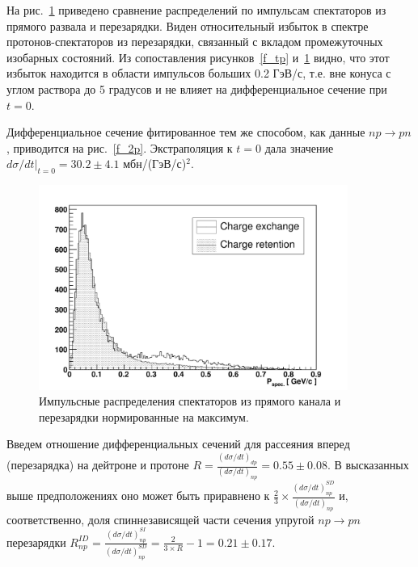 \documentclass[a4paper,12pt]{article}
\begin{document}
На рис.~\ref{f_res} приведено сравнение распределений по
импульсам спектаторов из прямого развала и перезарядки. Виден
относительный избыток в спектре протонов-спектаторов из перезарядки,
связанный с вкладом промежуточных изобарных состояний. Из
сопоставления рисунков~\ref{f_tp} и~\ref{f_res} видно, что этот
избыток находится в области импульсов больших 0.2 ГэВ/с, т.е. вне
конуса с углом раствора до 5 градусов и не влияет на дифференциальное
сечение при $t = 0$.

Дифференциальное сечение фитированное тем же способом, как данные $np
\to pn$, приводится на рис.~\ref{f_2p}.  Экстраполяция к $t = 0$ дала
значение $d\sigma/dt|_{t=0} = 30.2 \pm 4.1$ мбн/(ГэВ/с)$^{2}$.

\begin{figure}[hp]
  \centering
  \includegraphics[width=0.90\textwidth]{fig_res.pdf}
  \caption {Импульсные распределения спектаторов из прямого канала и
    перезарядки нормированные на максимум.}
  \label{f_res}
\end{figure}

Введем отношение дифференциальных сечений для рассеяния вперед
(перезарядка) на дейтроне и протоне
$R = \frac{(d\sigma/dt)_{dp}}{(d\sigma/dt)_{np}} = 0.55\pm 0.08$.
В высказанных выше предположениях оно может быть приравнено к
$\frac{2}{3} \times \frac{(d\sigma/dt)_{np}^{SD}}{(d\sigma/dt)_{np}}$
и, соответственно, доля спиннезависящей части сечения упругой
$np\to pn$ перезарядки
$R^{ID}_{np} = \frac{(d\sigma/dt)_{np}^{SI}}{{(d\sigma/dt)_{np}^{SD}}} =
\frac{2}{3\times R} - 1 = 0.21 \pm 0.17$.
\end{document}
